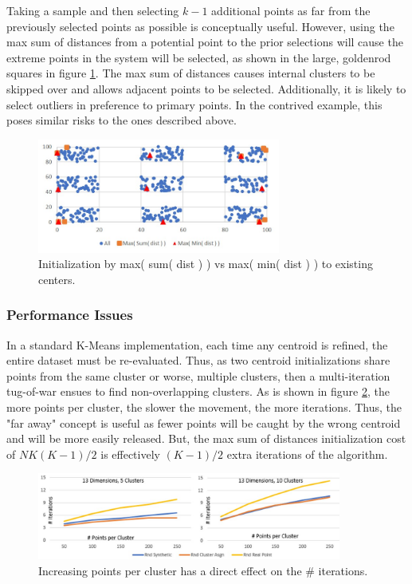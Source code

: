 \documentclass{article}
\begin{document}
Taking a sample and then selecting $k-1$ additional points as far from the previously selected points as possible is conceptually useful.  However, using the max sum of distances from a potential point to the prior selections will cause the extreme points in the system will be selected, as shown in the large, goldenrod squares in figure \ref{fig:maxiMinMeans}.  The max sum of distances causes internal clusters to be skipped over and allows adjacent points to be selected.  Additionally, it is likely to select outliers in preference to primary points.  In the contrived example, this poses similar risks to the ones described above.
 
\begin{figure}
  \centering
  \includegraphics[width=80mm,scale=0.3]{MaxiMinMeans.jpg}
  \caption{Initialization by max( sum( dist ) ) vs max( min( dist ) ) to existing centers.}
  \label{fig:maxiMinMeans}
\end{figure}

\subsubsection{Performance Issues}

In a standard K-Means implementation, each time any centroid is refined, the entire dataset must be re-evaluated.  Thus, as two centroid initializations share points from the same cluster or worse, multiple clusters, then a multi-iteration tug-of-war ensues to find non-overlapping clusters.  As is shown in figure \ref{fig:pointQtyIssue}, the more points per cluster, the slower the movement, the more iterations.  Thus, the "far away" concept is useful as fewer points will be caught by the wrong centroid and will be more easily released.  But, the max sum of distances initialization cost of $NK(K-1)/2$ is effectively $(K-1)/2$ extra iterations of the algorithm.

\begin{figure}
  \centering
  \includegraphics[width=100mm,scale=0.3]{PointQtyIssues.jpg}
  \caption{Increasing points per cluster has a direct effect on the \# iterations.}
  \label{fig:pointQtyIssue}
\end{figure}
\end{document}
